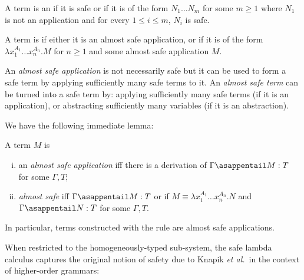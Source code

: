 \begin{definition}
A term is an 
if it is safe or if it is of the form $N_1 \ldots N_m$ for some $m\geq 1$ where $N_1$ is not an application and for every $1 \leq i\leq m$, $N_i$ is safe.

A term is  if either it is an almost safe application, or if it is of the form
$\lambda x_1^{A_1} \ldots x_n^{A_n}. M$ for $n\geq 1$ and some almost safe application $M$.
\end{definition}
An \emph{almost safe application} is not necessarily safe but it can be used to form a safe term by applying sufficiently many safe terms to it. An \emph{almost safe term} can be turned into a safe term by: applying sufficiently many safe terms (if it is an application), or
abstracting sufficiently many variables (if it is an abstraction).

We have the following immediate lemma:
\begin{lemma}
\label{lem:almostsafeapp_is_appplicative_safe}
A term $M$ is
\begin{enumerate}[(i)]
\item an \emph{almost safe application} iff there is a derivation of $\Gamma \asappentail M : T$ for some $\Gamma, T$;

\item \emph{almost safe} iff $\Gamma \asappentail M : T$ or if $M\equiv \lambda x_1^{A_1} \ldots x_n^{A_n}. N$ and $\Gamma \asappentail N : T$ for some $\Gamma, T$.
\end{enumerate}
\end{lemma}
In particular, terms constructed with the rule  are almost safe applications.
\bigskip

When restricted to the homogeneously-typed sub-system, the safe
lambda calculus captures the original notion of safety due to Knapik
\emph{et al.}~in the context of higher-order grammars:

